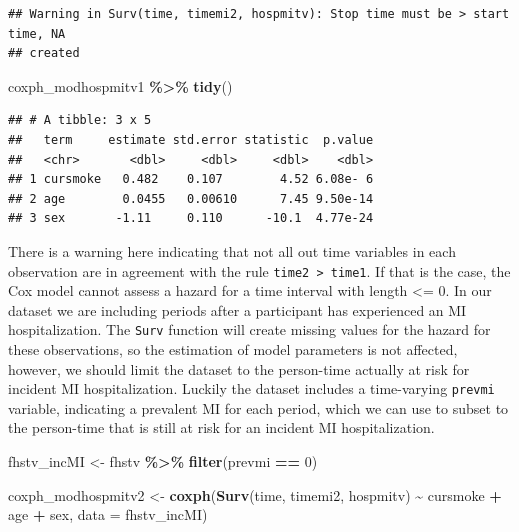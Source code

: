\documentclass[
]{book}
\newenvironment{Shaded}{\begin{snugshade}}{\end{snugshade}}
\newcommand{\AttributeTok}[1]{\textcolor[rgb]{0.13,0.29,0.53}{#1}}
\newcommand{\DecValTok}[1]{\textcolor[rgb]{0.00,0.00,0.81}{#1}}
\newcommand{\FunctionTok}[1]{\textcolor[rgb]{0.13,0.29,0.53}{\textbf{#1}}}
\newcommand{\NormalTok}[1]{#1}
\newcommand{\OtherTok}[1]{\textcolor[rgb]{0.56,0.35,0.01}{#1}}
\newcommand{\SpecialCharTok}[1]{\textcolor[rgb]{0.81,0.36,0.00}{\textbf{#1}}}
\begin{document}
\begin{verbatim}
## Warning in Surv(time, timemi2, hospmitv): Stop time must be > start time, NA
## created
\end{verbatim}

\begin{Shaded}
\begin{Highlighting}[]
\NormalTok{coxph\_modhospmitv1 }\SpecialCharTok{\%\textgreater{}\%}
  \FunctionTok{tidy}\NormalTok{()}
\end{Highlighting}
\end{Shaded}

\begin{verbatim}
## # A tibble: 3 x 5
##   term     estimate std.error statistic  p.value
##   <chr>       <dbl>     <dbl>     <dbl>    <dbl>
## 1 cursmoke   0.482    0.107        4.52 6.08e- 6
## 2 age        0.0455   0.00610      7.45 9.50e-14
## 3 sex       -1.11     0.110      -10.1  4.77e-24
\end{verbatim}

There is a warning here indicating that not all out time variables in each observation are in agreement with the rule \texttt{time2\ \textgreater{}\ time1}. If that is the case, the Cox model cannot assess a hazard for a time interval with length \textless= 0. In our dataset we are including periods after a participant has experienced an MI hospitalization. The \texttt{Surv} function will create missing values for the hazard for these observations, so the estimation of model parameters is not affected, however, we should limit the dataset to the person-time actually at risk for incident MI hospitalization. Luckily the dataset includes a time-varying \texttt{prevmi} variable, indicating a prevalent MI for each period, which we can use to subset to the person-time that is still at risk for an incident MI hospitalization.

\begin{Shaded}
\begin{Highlighting}[]
\NormalTok{fhstv\_incMI }\OtherTok{\textless{}{-}}\NormalTok{ fhstv }\SpecialCharTok{\%\textgreater{}\%}
  \FunctionTok{filter}\NormalTok{(prevmi }\SpecialCharTok{==} \DecValTok{0}\NormalTok{) }

\NormalTok{coxph\_modhospmitv2 }\OtherTok{\textless{}{-}} \FunctionTok{coxph}\NormalTok{(}\FunctionTok{Surv}\NormalTok{(time, timemi2, hospmitv) }\SpecialCharTok{\textasciitilde{}} 
\NormalTok{                              cursmoke }\SpecialCharTok{+}\NormalTok{ age }\SpecialCharTok{+}\NormalTok{ sex, }\AttributeTok{data =}\NormalTok{ fhstv\_incMI)}
\end{Highlighting}
\end{Shaded}
\end{document}
